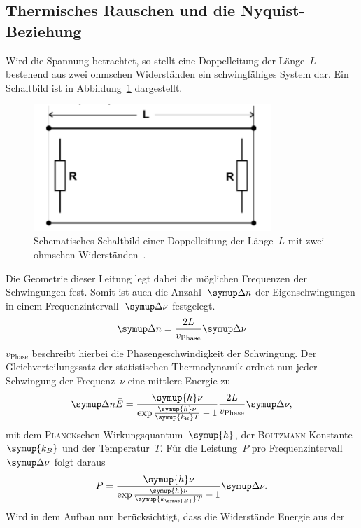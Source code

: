 \subsection{Thermisches Rauschen und die Nyquist-Beziehung}
%
Wird die Spannung betrachtet, so stellt eine Doppelleitung der Länge~$L$
bestehend aus zwei ohmschen Widerständen ein schwingfähiges System dar. Ein
Schaltbild ist in Abbildung~\ref{fig:doppelleitung} dargestellt.
%
\begin{figure}
  \centering
  \includegraphics[width=0.8\textwidth]{figures/Doppelleitung.pdf}
  \caption{Schematisches Schaltbild einer Doppelleitung der Länge~$L$ mit zwei
  ohmschen Widerständen~\cite{V57}.}
  \label{fig:doppelleitung}
\end{figure}
%
Die Geometrie dieser Leitung legt dabei die möglichen Frequenzen der
Schwingungen fest. Somit ist auch die Anzahl~$\upD n$ der Eigenschwingungen in
einem Frequenzintervall~$\upD\nu$ festgelegt.
%
\begin{equation}
  \upD n=\frac{2L}{v_\text{Phase}}\upD\nu
\end{equation}
%
$v_\text{Phase}$ beschreibt hierbei die Phasengeschwindigkeit der Schwingung.
Der Gleichverteilungssatz der statistischen Thermodynamik ordnet nun jeder
Schwingung der Frequenz~$\nu$ eine mittlere Energie zu
%
\begin{equation}
  \upD n\bar{E}=\frac{\symup{h}\nu}{\exp{\frac{\symup{h}\nu}{\symup{k_\text{B}}T}}-1}\frac{2L}{v_\text{Phase}}\upD\nu,
\end{equation}
%
mit dem \textsc{Planck}schen Wirkungsquantum~$\symup{h}$, der
\textsc{Boltzmann}-Konstante~$\symup{k_B}$ und der Temperatur~$T$. Für die
Leistung~$P$ pro Frequenzintervall~$\upD\nu$ folgt daraus
%
\begin{equation}
  P=\frac{\symup{h}\nu}{\exp{\frac{\symup{h}\nu}{\symup{k_{\symup{B}}}T}}-1}\upD\nu.
\end{equation}
%
Wird in dem Aufbau nun berücksichtigt, dass die Widerstände Energie aus der
